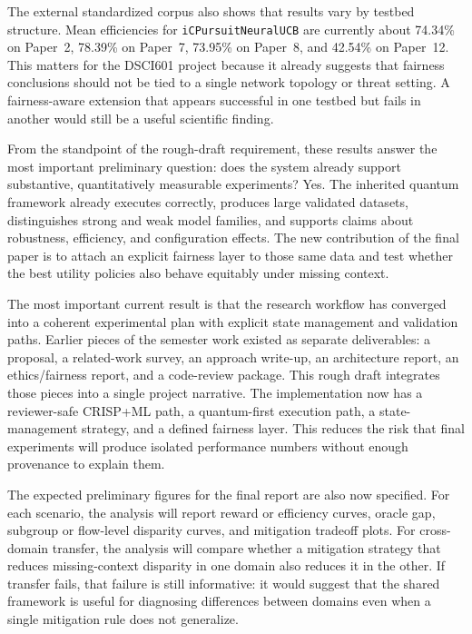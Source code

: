 \documentclass[conference]{IEEEtran}
\begin{document}
The external standardized corpus also shows that results vary by testbed
structure. Mean efficiencies for \texttt{iCPursuitNeuralUCB} are currently
about 74.34\% on Paper~2, 78.39\% on Paper~7, 73.95\% on Paper~8, and 42.54\%
on Paper~12. This matters for the DSCI601 project because it already suggests
that fairness conclusions should not be tied to a single network topology or
threat setting. A fairness-aware extension that appears successful in one
testbed but fails in another would still be a useful scientific finding.

From the standpoint of the rough-draft requirement, these results answer the
most important preliminary question: does the system already support
substantive, quantitatively measurable experiments? Yes. The inherited quantum
framework already executes correctly, produces large validated datasets,
distinguishes strong and weak model families, and supports claims about
robustness, efficiency, and configuration effects. The new contribution of the
final paper is to attach an explicit fairness layer to those same data and test
whether the best utility policies also behave equitably under missing context.

The most important current result is that the research workflow has converged
into a coherent experimental plan with explicit state management and validation
paths. Earlier pieces of the semester work existed as separate deliverables: a
proposal, a related-work survey, an approach write-up, an architecture report,
an ethics/fairness report, and a code-review package. This rough draft
integrates those pieces into a single project narrative. The implementation now
has a reviewer-safe CRISP+ML path, a quantum-first execution path, a
state-management strategy, and a defined fairness layer. This reduces the risk
that final experiments will produce isolated performance numbers without enough
provenance to explain them.

The expected preliminary figures for the final report are also now specified.
For each scenario, the analysis will report reward or efficiency curves,
oracle gap, subgroup or flow-level disparity curves, and mitigation tradeoff
plots. For cross-domain transfer, the analysis will compare whether a
mitigation strategy that reduces missing-context disparity in one domain also
reduces it in the other. If transfer fails, that failure is still informative:
it would suggest that the shared framework is useful for diagnosing differences
between domains even when a single mitigation rule does not generalize.
\end{document}
